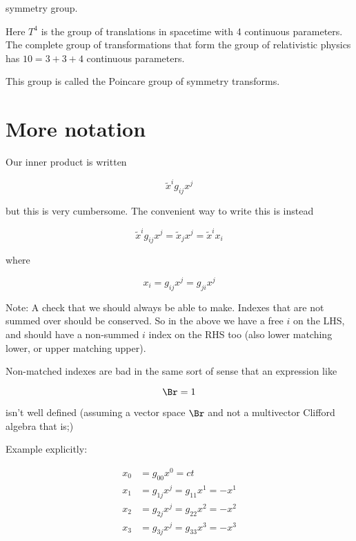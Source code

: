 symmetry group.

Here $T^4$ is the group of translations in spacetime with 4 continuous parameters.   The complete group of transformations that form the group of relativistic physics has $10 = 3 + 3 + 4$ continuous parameters.

This group is called the Poincare group of symmetry transforms.

\section{More notation}

Our inner product is written

\begin{equation}\label{eqn:relativisticElectrodynamicsL6:150}
\tilde{x}^i g_{ij} x^j
\end{equation}

but this is very cumbersome.  The convenient way to write this is instead

\begin{equation}\label{eqn:relativisticElectrodynamicsL6:160}
\tilde{x}^i g_{ij} x^j = \tilde{x}_j x^j = \tilde{x}^i x_i
\end{equation}

where 

\begin{equation}\label{eqn:relativisticElectrodynamicsL6:170}
x_i = g_{ij} x^j = g_{ji} x^j
\end{equation}

Note: A check that we should always be able to make.  Indexes that are not summed over should be conserved.  So in the above we have a free $i$ on the LHS, and should have a non-summed $i$ index on the RHS too (also lower matching lower, or upper matching upper).

Non-matched indexes are bad in the same sort of sense that an expression like

\begin{equation}\label{eqn:relativisticElectrodynamicsL6:180}
\Br = 1
\end{equation}

isn't well defined (assuming a vector space $\Br$ and not a multivector Clifford algebra that is;)

Example explicitly:

\begin{align*}
x_0 &= g_{0 0} x^0 = ct  \\
x_1 &= g_{1 j} x^j = g_{11} x^1 = -x^1 \\
x_2 &= g_{2 j} x^j = g_{22} x^2 = -x^2 \\
x_3 &= g_{3 j} x^j = g_{33} x^3 = -x^3
\end{align*}

